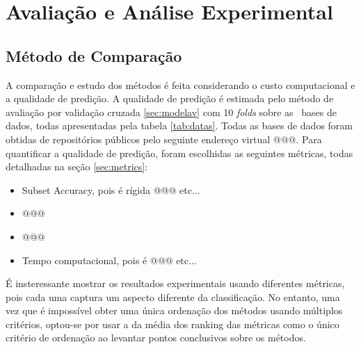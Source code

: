  



\chapter{Avaliação e Análise Experimental}
\section{Método de Comparação}

A comparação e estudo dos métodos é feita considerando o custo computacional e a qualidade de predição.
A qualidade de predição é estimada pelo método de avaliação por validação cruzada \ref{sec:modelav} com 10 \textit{folds}
sobre as \Nbases~bases de dados, todas apresentadas pela tabela \ref{tab:datas}.
Todas as bases de dados foram obtidas de repositórios públicos pelo seguinte
endereço virtual @@@.
Para quantificar a qualidade de predição, foram escolhidas as seguintes métricas, todas detalhadas na seção \ref{sec:metrics}:

\begin{itemize}
 \item Subset Accuracy, pois é rígida @@@ etc...
 \item @@@
 \item @@@
 \item Tempo computacional, pois é @@@ etc...
\end{itemize}

É insteressante mostrar os resultados experimentais usando diferentes métricas, pois cada uma captura
um aspecto diferente da classificação.
No entanto, uma vez que é impossível obter uma única ordenação dos métodos
usando múltiplos critérios,
optou-se por usar a da média dos ranking das métricas como
o único critério de ordenação ao levantar pontos conclusivos sobre os métodos. 

